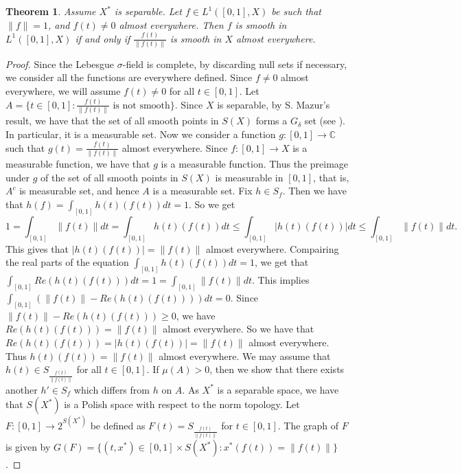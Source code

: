 \documentclass[12pt]{amsart}
\newtheorem{theorem}{Theorem}[section]
\theoremstyle{definition}
\numberwithin{equation}{section}
\begin{document}
\begin{theorem}\label{3t1}
   Assume $X^*$ is separable. Let $ f \in L^{1}([0,1],X)$ be such that $ \|f\| = 1 $, and $f(t)\neq 0$ almost everywhere. Then $ f $ is smooth in $L^{1}([0,1],X)$ if and only if $ \frac{f(t)}{\|f(t)\|} $ is smooth in $X$ almost everywhere.
\end{theorem}
\begin{proof}
 Since the Lebesgue $\sigma$-field is complete, by discarding null sets if necessary, we consider all the functions are everywhere defined. Since $f\neq0$ almost everywhere, we will assume $f(t)\neq0$ for all $t\in [0,1]$. Let $A=\{t\in[0,1]:\frac{f(t)}{\|f(t)\|}\text{ is not smooth}\}$. Since $X$ is separable, by S. Mazur's result, we have that the set of all smooth points in $S(X)$ forms a $G_{\delta}$ set (see \cite{MS}). In particular, it is a measurable set. Now we consider a function $g:[0,1]\to \mathbb{C}$ such that $g(t)=\frac{f(t)}{\|f(t)\|}$ almost everywhere. Since $f:[0,1]\to X$ is a measurable function, we have that $g$ is a measurable function. Thus the preimage under $g$ of the set of all smooth points in $S(X)$ is measurable in $[0,1]$, that is, $A^{c}$ is measurable set, and hence $A$ is a measurable set. Fix $h\in S_{f}$. Then we have that $h(f)=\int_{[0,1]}h(t)(f(t))dt=1$. So we get
    \[
   1= \int_{[0,1]}\|f(t)\|dt=\int_{[0,1]}h(t)(f(t))dt\leq \int_{[0,1]}|h(t)(f(t))|dt\leq \int_{[0,1]}\|f(t)\|dt.
    \]
    This gives that $|h(t)(f(t))|=\|f(t)\|$ almost everywhere. Compairing the real parts of the equation $\int_{[0,1]}h(t)(f(t))dt=1$, we get that $\int_{[0,1]}Re(h(t)(f(t)))dt=1=\int_{[0,1]}\|f(t)\|dt$. This implies $\int_{[0,1]}(\|f(t)\|-Re(h(t)(f(t))))dt=0$. Since $\|f(t)\|-Re(h(t)(f(t)))\geq 0$, we have $Re(h(t)(f(t)))=\|f(t)\|$ almost everywhere. So we  have that $Re(h(t)(f(t)))=|h(t)(f(t))|=\|f(t)\|$ almost everywhere. Thus $h(t)(f(t))=\|f(t)\|$ almost everywhere. We may assume that $h(t)\in S_{\frac{f(t)}{\|f(t)\|}}$ for all $t\in [0,1]$. If $\mu(A)>0$, then we show that there exists another $h'\in S_{f}$ which differs from $h$ on $A$. As $X^*$ is a separable space, we have that $S(X^*)$ is a Polish space with respect to the norm topology. Let $ F:[0,1] \to 2^{S(X^*)} $ be defined as $F(t) = S_{\frac{f(t)}{\|f(t)\|}}$ for $t\in [0,1]$. The graph of $F$ is given by $G(F) = \{ (t, x^*)\in[0,1]\times S(X^*)  :x^*(f(t))= \|f(t)\| \}$.


\end{proof}
\end{document}
